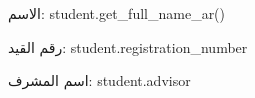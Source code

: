 \documentclass[fontsize=14,headinclude=true, headsepline=true,
footsepline=true]{scrartcl}
\begin{document}
\renewcommand*{\tableformat}{}
\renewcommand*{\captionformat}{}


{
}

الاسم: {{ student.get_full_name_ar() }}

رقم القيد: {{ student.registration_number }}

اسم المشرف: {{ student.advisor }}
\end{document}
